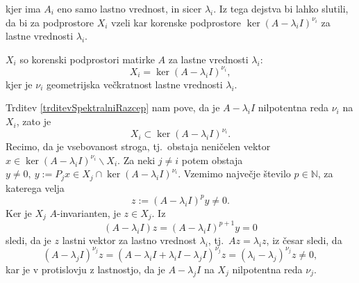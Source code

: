 \documentclass[mat1]{fmfdelo}
\newcommand{\N}{\mathbb N}
\begin{document}
kjer ima $A_i$ eno samo lastno vrednost, in sicer $\lambda_i$. Iz tega dejstva bi lahko slutili, da bi za podprostore $X_i$ vzeli kar korenske podprostore $\ker (A - \lambda_i I)^{\nu_i}$ za lastne vrednosti $\lambda_i$.
\begin{trditev}
    $X_i$ so korenski podprostori matirke $A$ za lastne vrednosti $\lambda_i$:
    \begin{equation*}
        X_i = \ker (A - \lambda_i I)^{\nu_i},
    \end{equation*}
    kjer je $\nu_i$ geometrijska večkratnost lastne vrednosti $\lambda_i$.
\end{trditev}
\begin{dokaz}
    Trditev \ref{trditevSpektralniRazcep} nam pove, da je $A - \lambda_i I$ nilpotentna reda $\nu_i$ na $X_i$, zato je
    \begin{equation} \label{strogaVsebovanost}
        X_i \subset \ker (A - \lambda_i I)^{\nu_i}.
    \end{equation}
    Recimo, da je vsebovanost stroga, tj.\ obstaja neničelen vektor $x \in \ker (A - \lambda_i I)^{\nu_i} \backslash X_i$. Za neki $j \neq i$ potem obstaja $y \neq 0,\ y := P_j x \in X_j \cap \ker (A - \lambda_i I)^{\nu_i}$. Vzemimo največje število $p \in \N$, za katerega velja
    \begin{equation*}
        z := (A - \lambda_i I)^p y \neq 0.
    \end{equation*}
    Ker je $X_j$ $A$-invarianten, je $z \in X_j$. Iz
    \begin{equation*}
        (A - \lambda_i I) z = (A - \lambda_i I)^{p+1} y = 0
    \end{equation*}
    sledi, da je $z$ lastni vektor za lastno vrednost $\lambda_i$, tj.\ $A z = \lambda_i z$, iz česar sledi, da
    \begin{equation*}
        (A - \lambda_j I)^{\nu_j} z = \left(A - \lambda_i I + \lambda_i I - \lambda_j I\right)^{\nu_j} z = (\lambda_i - \lambda_j)^{\nu_j} z \neq 0,
    \end{equation*}
    kar je v protislovju z lastnostjo, da je $A - \lambda_j I$ na $X_j$ nilpotentna reda $\nu_j$.
\end{dokaz}
\end{document}
